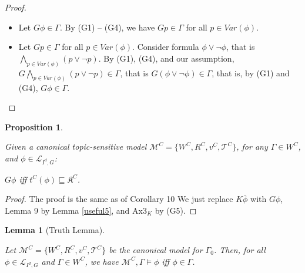 \documentclass{article}
\newtheorem{prop}{Proposition}
\newtheorem{lemma}{Lemma}
\begin{document}
\begin{proof}



\begin{itemize}

\item[$(\Rightarrow)$] Let $G \phi \in \Gamma$. By (G1) -- (G4), we have $Gp \in \Gamma$ for all $p \in Var(\phi)$.




\item[$(\Leftarrow)$] Let $G p \in \Gamma$ for all $p \in Var(\phi)$. Consider formula $\phi \vee \neg \phi$, that is $\bigwedge_{p \in Var(\phi)} (p \vee \neg p)$. By (G1), (G4), and our assumption, $G \bigwedge_{p \in Var(\phi)} (p \vee \neg p) \in \Gamma$, that is $G (\phi \vee \neg \phi) \in \Gamma$, that is, by (G1) and (G4), $G \phi \in \Gamma$.




\end{itemize}

\end{proof}



\begin{prop}
\label{useful6}

Given a canonical topic-sensitive model $\mathcal{M}^{C} = \{W^{C}, R^{C}, v^{C}, \mathcal{T}^{C}\}$, for any $\Gamma \in W^{C}$, and $\phi \in \mathcal{L}_{I^{d}, G}$:

\begin{center}

$G \phi$ iff $t^{C}(\phi) \sqsubseteq \mathfrak{K}^{C}$.

\end{center}

\end{prop}

\begin{proof}

The proof is the same as of Corollary 10 \citep{Ozgun2023} We just replace $K\bar{\phi}$ with $G\phi$, Lemma 9 by Lemma \ref{useful5}, and Ax3$_{K}$ by (G5).

\end{proof}

\begin{lemma}[Truth Lemma]
\label{TLHDI}

Let $\mathcal{M}^{C} = \{W^{C}, R^{C}, v^{C}, \mathcal{T}^{C}\}$ be the canonical model for $\Gamma_{0}$. Then, for all $\phi \in \mathcal{L}_{I^{d}, G}$ and $\Gamma \in W^{C}$, we have $\mathcal{M}^{C}, \Gamma \models \phi$ iff $\phi \in \Gamma$.

\end{lemma}
\end{document}
